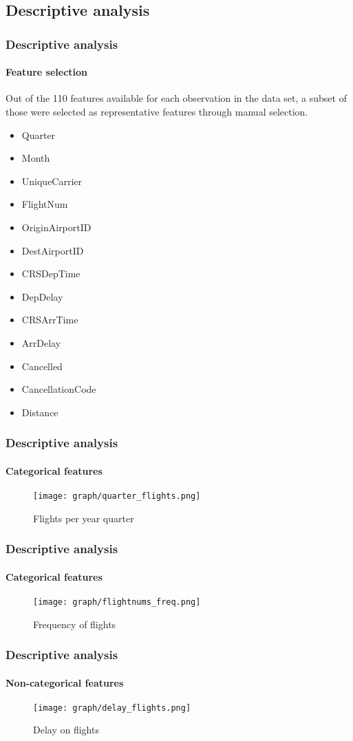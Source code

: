 \documentclass{beamer}
\begin{document}
	\begin{frame}
		\section[Section]{Descriptive analysis}
		\frametitle{Descriptive analysis}
		\framesubtitle{Feature selection}
		Out of the 110 features available for each observation in the data set, a subset
	    of those were selected as representative features through manual selection.\newline
		\begin{itemize}
	            \item Quarter
	            \item Month
	            \item UniqueCarrier
	            \item FlightNum
	            \item OriginAirportID
	            \item DestAirportID
	            \item CRSDepTime
	            \item DepDelay
	            \item CRSArrTime
	            \item ArrDelay
	            \item Cancelled
	            \item CancellationCode
	            \item Distance
	    \end{itemize}
	\end{frame}
	\begin{frame}
		\frametitle{Descriptive analysis}
		\framesubtitle{Categorical features}
		\begin{figure}[h!]
		  \texttt{[image: graph/quarter\_flights.png]}
		  \caption{Flights per year quarter}
		  \label{fig:graph1}
		\end{figure}\newline
	\end{frame}
	\begin{frame}
		\frametitle{Descriptive analysis}
		\framesubtitle{Categorical features}
		\begin{figure}
		  \texttt{[image: graph/flightnums\_freq.png]}
		  \caption{Frequency of flights}
		  \label{fig:graph1}
		\end{figure}\newline
	\end{frame}
	\begin{frame}
		\frametitle{Descriptive analysis}
		\framesubtitle{Non-categorical features}
		\begin{figure}
		  \texttt{[image: graph/delay\_flights.png]}
		  \caption{Delay on flights}
		  \label{fig:graph1}
		\end{figure}\newline
	\end{frame}
\end{document}
